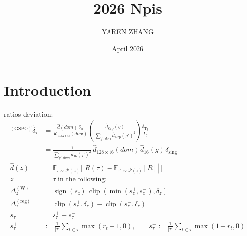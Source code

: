 \documentclass{article}
\title{2026 Npis}
\author{YAREN ZHANG}
\date{April 2026}
\begin{document}
\maketitle

\section{Introduction}

ratios deviation:
\begin{align*}
{}^{(\text{GSPO})}\tilde{\delta}_\tau 
&= \frac{\hat d(dom)\,\delta_{\text{D}}}{R_{\max res}(dom)}
   \left( \frac{\hat d_{\operatorname{Grp}}(g)}{\sum_{g':dom} \hat d_{\operatorname{Grp}}(g')^2} \right)
   \frac{\delta_{\operatorname{Tj}}}{T_g} \\
&\doteq \frac{1}{\sum_{g':dom} \hat d_{16}(g')^2}\,
   \hat d_{128\times 16}(dom)\,\hat d_{16}(g)\,\delta_{\operatorname{sing}} \\
\hat d(z) &= \mathbb{E}_{\tau \sim \mathcal{P}(z)}\bigl[\,|R(\tau) - \mathbb{E}_{\tau'\sim \mathcal{P}(z)}[R]|\,\bigr] \\
z &= \tau \text{ in the following:} \\
\Delta_z^{(\text{W})}   &= \operatorname{sign}(s_z)\,\operatorname{clip}(\min(s_z^+, s_z^-), \delta_z) \\
\Delta_z^{(\text{reg})} &= \operatorname{clip}(s_z^+, \delta_z) - \operatorname{clip}(s_z^-, \delta_z) \\
s_\tau &= s_\tau^+ - s_\tau^- \\
s_\tau^+ &:= \frac{1}{|\tau|}\sum_{t\in\tau}\max(r_t - 1, 0), \qquad
s_\tau^- := \frac{1}{|\tau|}\sum_{t\in\tau}\max(1 - r_t, 0)
\end{align*}
\end{document}

